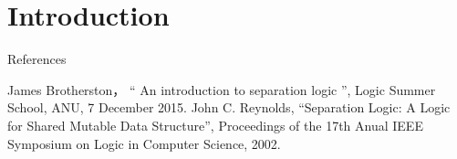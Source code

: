 \documentclass[notheorems, aspectratio=169, 12pt, unicode]{beamer}
\begin{document}
\begin{frame}
 \titlepage
\end{frame}
\section{Introduction}

\begin{frame}{References}
 \begin{thebibliography}{9}
   James Brotherston，
	  `` An introduction to separation logic '', 
	  Logic Summer School, ANU, 7 December 2015.
   John C. Reynolds, ``Separation Logic: A Logic for Shared Mutable Data Structure'', Proceedings of the 17th Anual IEEE Symposium on Logic in Computer Science, 2002.
 \end{thebibliography} 
\end{frame}
\end{document}
